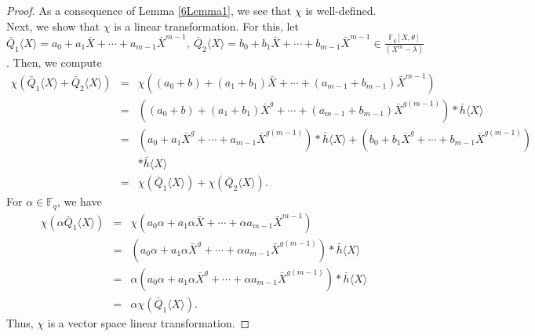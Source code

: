 \documentclass[12pt]{article}
\begin{document}
\begin{proof}
	
	As a consequence of Lemma \ref{6Lemma1}, we see that \( \chi \) is well-defined. Next, we show that \( \chi \) is a linear transformation.
	For this, let \( \bar{Q}_1\langle X \rangle=a_0+a_1\bar{X}+\cdots+a_{m-1}\bar{X}^{m-1},~ \bar{Q}_2\langle X \rangle= b_0+b_1\bar{X}+\cdots+b_{m-1}\bar{X}^{m-1} \in \frac{\mathbb{F}_q[X,\theta]}{(X^m - \lambda)} \). Then, we compute
	\begin{eqnarray*}
		\chi(\bar{Q}_1\langle X \rangle+\bar{Q}_2\langle X \rangle)&=&\chi((a_0+b)+(a_1+b_1)\bar{X}+\cdots+(a_{m-1}+b_{m-1})\bar{X}^{m-1})\\
		&=&((a_0+b)+(a_1+b_1)\bar{X}^g+\cdots+(a_{m-1}+b_{m-1})\bar{X}^{g(m-1)})\ast \bar{h}\langle X \rangle\\
		&=&(a_0+a_1\bar{X}^g+\cdots+a_{m-1}\bar{X}^{g(m-1)})*\bar{h}\langle X \rangle+(b_0+b_1\bar{X}^g+\cdots+b_{m-1}\bar{X}^{g(m-1)})\\
		&~&\ast \bar{h}\langle X \rangle\\
		&=&\chi(\bar{Q}_1\langle X \rangle)+\chi(\bar{Q}_2\langle X \rangle).
	\end{eqnarray*}
	For $\alpha\in \mathbb{F}_q$, we have
	\begin{eqnarray*}
		\chi(\alpha \bar{Q}_1\langle X \rangle)&=&\chi(a_0\alpha+a_1\alpha \bar{X}+\cdots+\alpha a_{m-1}\bar{X}^{m-1})\\
		&=&(a_0\alpha+a_1\alpha \bar{X}^g+\cdots+\alpha a_{m-1}\bar{X}^{g(m-1)})\ast \bar{h}\langle X \rangle\\
		&=&\alpha(a_0\alpha+a_1\alpha \bar{X}^g+\cdots+\alpha a_{m-1}\bar{X}^{g(m-1)})\ast \bar{h}\langle X \rangle\\
		&=&\alpha\chi(\bar{Q}_1\langle X \rangle).
	\end{eqnarray*} 
	Thus, $\chi$ is a vector space linear transformation.
\end{proof}
\end{document}
